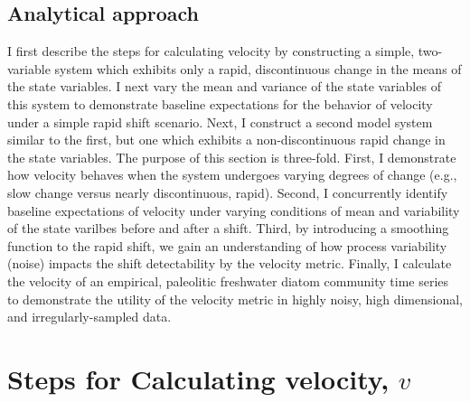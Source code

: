 \documentclass[12pt,twoside,openany]{reedthesis}
\begin{document}
\hypertarget{analytical-approach}{%
\subsection{Analytical approach}\label{analytical-approach}}

I first describe the steps for calculating velocity by constructing a simple, two-variable system which exhibits only a rapid, discontinuous change in the means of the state variables. I next vary the mean and variance of the state variables of this system to demonstrate baseline expectations for the behavior of velocity under a simple rapid shift scenario. Next, I construct a second model system similar to the first, but one which exhibits a non-discontinuous rapid change in the state variables. The purpose of this section is three-fold. First, I demonstrate how velocity behaves when the system undergoes varying degrees of change (e.g., slow change versus nearly discontinuous, rapid). Second, I concurrently identify baseline expectations of velocity under varying conditions of mean and variability of the state varilbes before and after a shift. Third, by introducing a smoothing function to the rapid shift, we gain an understanding of how process variability (noise) impacts the shift detectability by the velocity metric. Finally, I calculate the velocity of an empirical, paleolitic freshwater diatom community time series to demonstrate the utility of the velocity metric in highly noisy, high dimensional, and irregularly-sampled data.

\hypertarget{steps-for-calculating-velocity-v}{%
\section{\texorpdfstring{Steps for Calculating velocity, \(v\)}{Steps for Calculating velocity, v}}\label{steps-for-calculating-velocity-v}}
\end{document}
